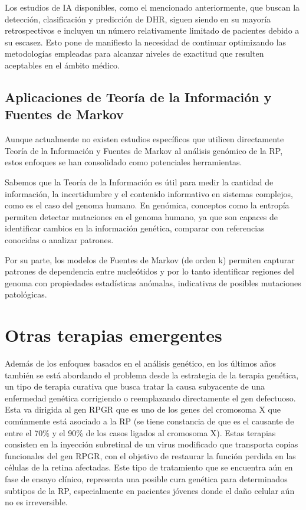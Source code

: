 \documentclass[11pt,spanish,listoffigures,listoftables]{tfgetsinf}
\begin{document}
Los estudios de IA disponibles, como el mencionado anteriormente, que buscan la detección, clasificación y predicción de DHR, siguen siendo en su mayoría retrospectivos e incluyen un número relativamente limitado de pacientes debido a su escasez\cite{ISS}. Esto pone de manifiesto la necesidad de continuar optimizando las metodologías empleadas para alcanzar niveles de exactitud que resulten aceptables en el ámbito médico.

\subsection{Aplicaciones de Teoría de la Información y Fuentes de Markov}

Aunque actualmente no existen estudios específicos que utilicen directamente Teoría de la Información y Fuentes de Markov al análisis genómico de la RP, estos enfoques se han consolidado como potenciales herramientas.

Sabemos que la Teoría de la Información es útil para medir la cantidad de información, la incertidumbre y el contenido informativo en sistemas complejos, como es el caso del genoma humano. En genómica, conceptos como la entropía permiten detectar mutaciones en el genoma humano, ya que son capaces de identificar cambios en la información genética, comparar con referencias conocidas o analizar patrones\cite{SEC}.

Por su parte, los modelos de Fuentes de Markov (de orden k) permiten capturar patrones de dependencia entre nucleótidos y por lo tanto identificar regiones del genoma con propiedades estadísticas anómalas\cite{VOZ}, indicativas de posibles mutaciones patológicas.

\section{Otras terapias emergentes}

Además de los enfoques basados en el análisis genético, en los últimos años también se está abordando el problema desde la estrategia de la terapia genética, un tipo de terapia curativa que busca tratar la causa subyacente de una enfermedad genética corrigiendo o reemplazando directamente el gen defectuoso. Esta va dirigida al gen RPGR que es uno de los genes del cromosoma X que comúnmente está asociado a la RP (se tiene constancia de que es el causante de entre el 70\% y el 90\% de los casos ligados al cromosoma X)\cite{WAN}. Estas terapias consisten en la inyección subretinal de un virus modificado que transporta copias funcionales del gen RPGR, con el objetivo de restaurar la función perdida en las células de la retina afectadas\cite{ZON}. Este tipo de tratamiento que se encuentra aún en fase de ensayo clínico, representa una posible cura genética para determinados subtipos de la RP, especialmente en pacientes jóvenes donde el daño celular aún no es irreversible.
\end{document}
